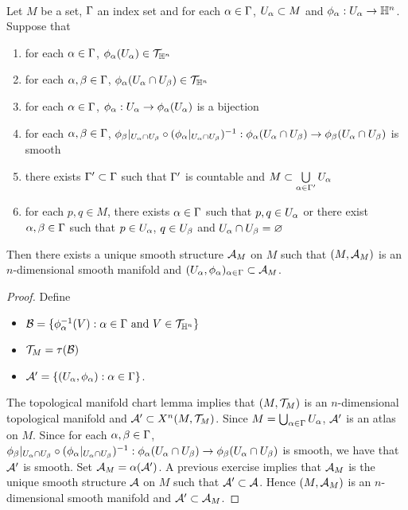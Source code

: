 \documentclass{book}
\begin{document}
		
	\begin{ex}  \\
		Let $M$ be a set, $\Gamma$ an index set and for each $\alpha \in \Gamma$, $U_{\alpha} \subset M$ and $\phi_{\alpha}: U_{\alpha} \rightarrow \mathbb{H}^n$. Suppose that 
		\begin{enumerate}[label=(\alph*)]
			\item for each $\alpha \in \Gamma$, $\phi_{\alpha}(U_{\alpha}) \in \mathcal{T}_{\mathbb{H}^n}$
			\item for each $\alpha, \beta \in \Gamma$, $\phi_{\alpha}(U_{\alpha} \cap U_{\beta}) \in \mathcal{T}_{\mathbb{H}^n}$
			\item for each $\alpha \in \Gamma$, $\phi_{\alpha}: U_{\alpha} \rightarrow \phi_{\alpha}(U_{\alpha})$ is a bijection
			\item for each $\alpha, \beta \in \Gamma$, $\phi_{\beta}|_{U_{\alpha} \cap U_{\beta}} \circ (\phi_{\alpha}|_{U_{\alpha} \cap U_{\beta}})^{-1}: \phi_{\alpha}(U_{\alpha} \cap U_{\beta}) \rightarrow \phi_{\beta}(U_{\alpha} \cap U_{\beta})$ is smooth
			\item there exists $\Gamma' \subset \Gamma$ such that $\Gamma'$ is countable and $M \subset \bigcup\limits_{\alpha \in \Gamma'} U_{\alpha}$
			\item for each $p,q \in M$, there exists $\alpha \in \Gamma$ such that $p,q \in U_{\alpha}$ or there exist $\alpha,\beta \in \Gamma$ such that $p \in U_{\alpha}$, $q \in U_{\beta}$ and $U_{\alpha} \cap U_{\beta} = \varnothing$
		\end{enumerate}
		Then there exists a unique smooth structure $\mathcal{A}_M$ on $M$ such that $(M, \mathcal{A}_M)$ is an $n$-dimensional smooth manifold and $(U_{\alpha}, \phi_{\alpha})_{\alpha \in \Gamma} \subset \mathcal{A}_M$.
	\end{ex}
	
	\begin{proof}
		Define
		\begin{itemize}
			\item $\mathcal{B} = \{\phi_{\alpha}^{-1}(V): \alpha \in \Gamma \text{ and } V \in \mathcal{T}_{\mathbb{H}^n}\}$ 
			\item $\mathcal{T}_M = \tau(\mathcal{B})$ 
			\item $\mathcal{A}' = \{(U_{\alpha}, \phi_{\alpha}) : \alpha \in \Gamma\}$.
		\end{itemize}
		The topological manifold chart lemma implies that $(M, \mathcal{T}_M)$ is an $n$-dimensional topological manifold and $\mathcal{A}' \subset X^n(M, \mathcal{T}_M)$. Since $M = \bigcup_{\alpha \in \Gamma} U_{\alpha}$, $\mathcal{A}'$ is an atlas on $M$. Since for each $\alpha, \beta \in \Gamma$, $\phi_{\beta}|_{U_{\alpha} \cap U_{\beta}} \circ (\phi_{\alpha}|_{U_{\alpha} \cap U_{\beta}})^{-1}: \phi_{\alpha}(U_{\alpha} \cap U_{\beta}) \rightarrow \phi_{\beta}(U_{\alpha} \cap U_{\beta})$ is smooth, we have that $\mathcal{A}'$ is smooth. Set $\mathcal{A}_M = \alpha(\mathcal{A}')$. A previous exercise implies that $\mathcal{A}_M$ is the unique smooth structure $\mathcal{A}$ on $M$ such that $\mathcal{A}' \subset \mathcal{A}$. Hence $(M, \mathcal{A}_M)$ is an $n$-dimensional smooth manifold and $\mathcal{A}' \subset \mathcal{A}_M$.
	\end{proof}
	
\end{document}
